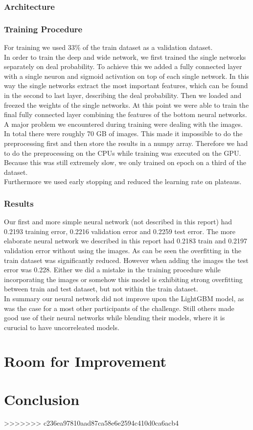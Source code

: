 \documentclass[runningheads]{llncs}
\begin{document}
 \subsubsection{Architecture}
 \subsubsection{Training Procedure}
 For training we used 33\% of the train dataset as a validation dataset.\\
In order to train the deep and wide network, we first trained the single networks separately on deal probability. To achieve this we added a fully connected layer with a single neuron and sigmoid activation on top of each single network. In this way the single networks extract the most important features, which can be found in the second to last layer, describing the deal probability. Then we loaded and freezed the weights of the single networks. At this point we were able to train the final fully connected layer combining the features of the bottom neural networks.\\
A major problem we encountered during training were dealing with the images. In total there were roughly 70 GB of images. This made it impossible to do the preprocessing first and then store the results in a numpy array. Therefore we had to do the preprocessing on the CPUs while training was executed on the GPU. Because this was still extremely slow, we only trained on epoch on a third of the dataset.\\
Furthermore we used early stopping and reduced the learning rate on plateaus.
 \subsubsection{Results}
 Our first and more simple neural network (not described in this report) had 0.2193 training error, 0.2216 validation error and 0.2259 test error. The more elaborate neural network we described in this report had 0.2183 train and 0.2197 validation error without using the images. As can be seen the overfitting in the train dataset was significantly reduced. However when adding the images the test error was 0.228. Either we did a mistake in the training procedure while incorporating the images or somehow this model is exhibiting strong overfitting between train and test dataset, but not within the train dataset.\\
 In summary our neural network did not improve upon the LightGBM model, as was the case for a most other participants of the challenge. Still others made good use of their neural networks while  blending their models, where it is curucial
  to have uncorreleated models.\\
 
 
 \section{Room for Improvement}
 \section{Conclusion}

>>>>>>> c236ea97810aad87ca58e6e2594c410d0ca6acb4
\end{document}
